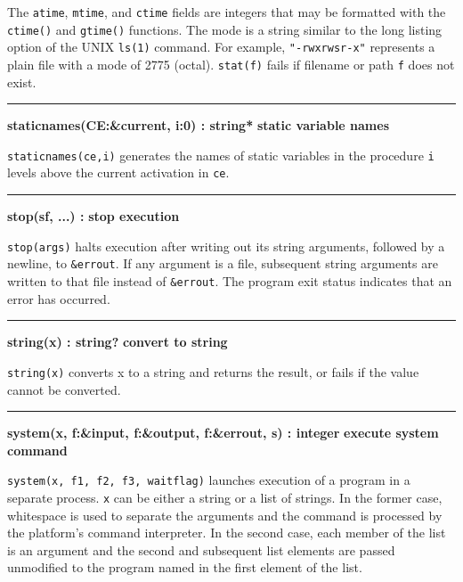 The \texttt{atime}, \texttt{mtime}, and \texttt{ctime} fields are
integers that may be formatted with the \texttt{ctime()} and
\texttt{gtime()} functions. The mode is a string similar to the long
listing option of the UNIX \texttt{ls(1)} command. For example,
\texttt{"-rwxrwsr-x"} represents a plain
file with a mode of 2775 (octal). \texttt{stat(f)} fails if filename or
path \texttt{f} does not exist.

\bigskip\hrule\vspace{0.1cm}
\noindent
{\bf staticnames(CE:\&current, i:0) : string* } \hfill {\bf static variable names}

\noindent
{}\texttt{staticnames(ce,i)} generates the names of static
variables in the procedure \texttt{i} levels above the current
activation in \texttt{ce}.

\bigskip\hrule\vspace{0.1cm}
\noindent
{\bf stop(s{\textbar}f, ...) : } \hfill {\bf stop execution}

\noindent
{}\texttt{stop(args)} halts execution after
writing out its string arguments, followed by a newline, to
\texttt{\&errout}. If any argument is a file, subsequent string
arguments are written to that file instead of \texttt{\&errout}. The
program exit status indicates that an error has occurred.

\bigskip\hrule\vspace{0.1cm}
\noindent
{\bf string(x) : string? } \hfill {\bf convert to string}

\noindent
{}\texttt{string(x)} converts x
to a string and returns the result, or fails if the value cannot be
converted.

\bigskip\hrule\vspace{0.1cm}
\noindent
{\bf system(x, f:\&input, f:\&output, f:\&errout, s) : integer } \hfill {\bf execute system command}

\noindent
{}\texttt{system(x, f1, f2, f3, waitflag)} launches
execution of a program in a separate process. \texttt{x} can be either
a string or a list of strings. In the former case, whitespace is used
to separate the arguments and the command is processed by the
platform's command interpreter. In the second case,
each member of the list is an argument and the second and subsequent
list elements are passed unmodified to the program named in the first
element of the list.

